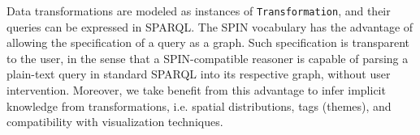 \documentclass[]{interact}
\theoremstyle{plain}%
\theoremstyle{definition}
\theoremstyle{remark}
\theoremstyle{definition}
\begin{document}
Data transformations are modeled as instances of \texttt{Transformation}, and their queries can be expressed in SPARQL. The SPIN vocabulary has the advantage of allowing the specification of a query as a graph. Such specification is transparent to the user, in the sense that a SPIN-compatible reasoner is capable of parsing a plain-text query in standard SPARQL into its respective graph, without user intervention. Moreover, we take benefit from this advantage to infer implicit knowledge from transformations, i.e. spatial distributions, tags (themes), and compatibility with visualization techniques.
%


%
\end{document}
